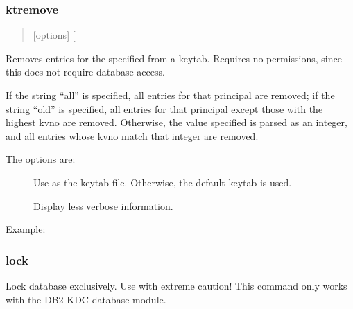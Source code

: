 \documentclass[letterpaper,10pt,english]{sphinxmanual}
\begin{document}
\subsubsection{ktremove}
\label{\detokenize{admin/admin_commands/kadmin_local:id18}}\label{\detokenize{admin/admin_commands/kadmin_local:ktremove}}\label{\detokenize{admin/admin_commands/kadmin_local:ktadd-end}}\begin{quote}

 {[}options{]}  {[} \textbar{}  \textbar{} \sphinxstyleemphasis{old}{]}
\end{quote}

Removes entries for the specified  from a keytab.  Requires
no permissions, since this does not require database access.

If the string “all” is specified, all entries for that principal are
removed; if the string “old” is specified, all entries for that
principal except those with the highest kvno are removed.  Otherwise,
the value specified is parsed as an integer, and all entries whose
kvno match that integer are removed.

The options are:
\begin{description}
\item[{ }] \leavevmode
Use  as the keytab file.  Otherwise, the default keytab is
used.

\item[{}] \leavevmode
Display less verbose information.

\end{description}

Example:

%
\begin{sphinxVerbatim}[commandchars=\\\{\}]
   
         
\end{sphinxVerbatim}


\subsubsection{lock}
\label{\detokenize{admin/admin_commands/kadmin_local:ktremove-end}}\label{\detokenize{admin/admin_commands/kadmin_local:lock}}
Lock database exclusively.  Use with extreme caution!  This command
only works with the DB2 KDC database module.
\end{document}
